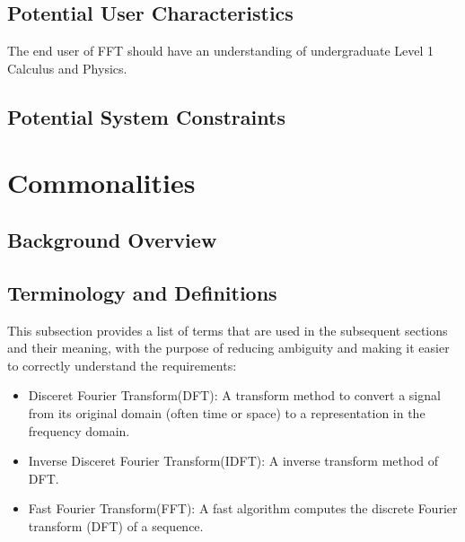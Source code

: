\documentclass[12pt]{article}
\newcommand{\famname}{FFT} %
\begin{document}
\subsection{Potential User Characteristics} \label{SecUserCharacteristics}

The end user of \famname{} should have an understanding of undergraduate Level
1 Calculus and Physics.

\subsection{Potential System Constraints}


\section{Commonalities}

\subsection{Background Overview} \label{Sec_Background}

\subsection{Terminology and  Definitions}

This subsection provides a list of terms that are used in the subsequent
sections and their meaning, with the purpose of reducing ambiguity and making it
easier to correctly understand the requirements:

\begin{itemize}
\item Disceret Fourier Transform(DFT): A transform method to convert a signal from its original domain (often time or space) to a representation in the frequency domain.
\end{itemize}

\begin{itemize}
\item Inverse Disceret Fourier Transform(IDFT): A inverse transform method of DFT. 
\end{itemize}

\begin{itemize}
\item Fast Fourier Transform(FFT): A fast algorithm computes the discrete Fourier transform (DFT) of a sequence.
\end{itemize}
\end{document}
